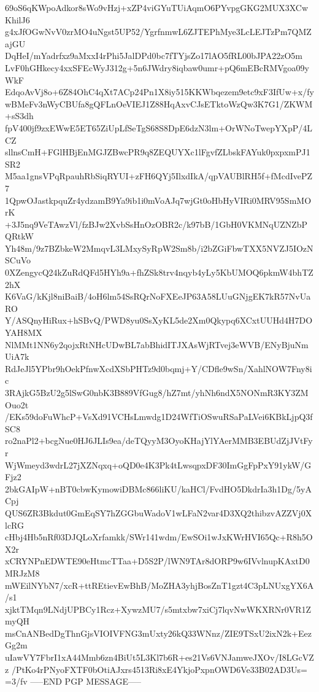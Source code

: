 69oS6qKWpoAdkor8sWo9vHzj+xZP4viGYuTUiAqmO6PYvpgGKG2MUX3XCwKhilJ6
g4xJfOGwNvV0zrMO4uNgst5UP52/YgrfnmwL6ZJTEPhMye3LcLEJTzPm7QMZajGU
DqHeI/mYadrfxz9aMxxI4rPhi5JalDPd0bc7fTYjsZo17lAO5fRL00bJPA22zO5m
LvF0hGHkecy4xxSFEcWyJ312g+5n6JWdry8iqbaw0umr+pQ6mEBcRMVgoa09yWkF
EdqoAvVj8o+6Z84OhC4qXt7ACp24Pn1X8iy515KKWbqezem9etc9xF3IfUw+x/fy
wBMeFv3nWyCBUfa8gQFLnOeVIEJ1Z88HqAxvCJsETktoWzQw3K7G1/ZKWM+sS3dh
fpV400jf9zxEWwE5ET65ZiUpLfSeTgS68S8DpE6dzN3lm+OrWNoTwepYXpP/4LCZ
sllnsCmH+FGlHBjEnMGJZBwcPR9q8ZEQUYXc1lFgvfZLbskFAYuk0pxpxmPJ1SR2
M5aa1gnsVPqRpauhRbSiqRYUI+zFH6QYj5IlxdIkA/qpVAUBlRH5f+fMcdIvePZ7
1QpwOJastkpquZr4ydzamB9Ya9ib1i0mVoAJq7wjGt0oHbHyVIRi0MRV95SmMOrK
+3J5nq9VeTAwzVl/fzBJw2XvbSsHnOzOBR2c/k97bB/1GbH0VKMNqUZNZbPQRtkW
Yh48m/9z7BZbkeW2MmqvL3LMxySyRpW2Sm8b/i2bZGiFbwTXX5NVZJ5IOzNSCuVo
0XZengycQ24kZuRdQFd5HYh9a+fhZSk8trv4nqyb4yLy5KbUMOQ6pkmW4bhTZ2hX
K6VaG/kKjl8niBaiB/4oH6lm54SsRQrNoFXEeJP63A58LUuGNjgEK7kR57NvUaRO
Y/ASQnyHiRux+hSBvQ/PWD8yu0SsXyKL5de2Xm0Qkypq6XCxtUUHd4H7DOYAH8MX
NlMMt1NN6y2qojxRtNHcUDwBL7abBhidITJXAsWjRTvej3eWVB/ENyBjuNmUiA7k
RdJeJl5YPbr9hOekPfnwXcdXSbPHTz9d0bqmj+Y/CDfle9wSn/XahlNOW7Fny8ic
3RAjkG5BzU2g5lSwG0nbK3B889VfGug8/hZ7mt/yhNh6ndX5NONmR3KY3ZMOuo2t
/EKs59doFuWhcP+VsXd91VCHsLmwdg1D24WfTiOSwuRSaPaLVei6KBkLjpQ3fSC8
ro2naPl2+bcgNue0HJ6JLIs9ea/deTQyyM3OyoKHajYlYAerMMB3EBUdZjJVtFyr
WjWmeyd3wdrL27jXZNqxq+oQD0e4K3Pk4tLwsqpxDF30ImGgFpPxY91ykW/GFjz2
2bkGAIpW+nBT0cbwKymowiDBMc866liKU/kaHCl/FvdHO5DkdrIa3h1Dg/5yACpj
QUS6ZR3Bkdut0GmEqSY7hZGGbuWadoV1wLFaN2var4D3XQ2thibzvAZZVj0XlcRG
cHbj4Hb5nRf03DJQLoXrfamkk/SWr141wdm/EwSOi1wJxKWrHVI65Qc+R8h5OX2r
xCRYNPnEDWTE90eHtmcTTaa+D5S2P/lWN9TAr8dORP9w6IVvlnupKAxtD0MRJzM8
mWEilNYbN7/xcR+ttREtievEwBhB/MoZHA3yhjBosZnT1gzt4C3pLNUxgYX6A/s1
xjktTMqn9LNdjUPBCy1Rcz+XywzMU7/s5mtxbw7xiCj7lqvNwWKXRNr0VR1ZmyQH
msCnANBedDgThnGjsVIOIVFNG3mUxty26kQ33WNnz/ZIE9TSxU2ixN2k+EezGg2m
uIawVY7FbrI1xA44Mmb6zn4BiUt5L3Kl7b6R+es21Vs6VNJamweJXOv/I8LGcVZz
/PtKo4rPNyoFXTF0bOtiAJxrs4513Ri8xE4YkjoPxpnOWD6Ve33B02AD3Us=
=3/fv
-----END PGP MESSAGE-----
